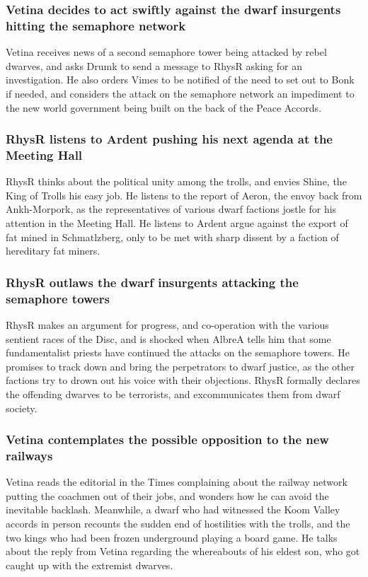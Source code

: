 \subsubsection{\Gls{Vetina} decides to act swiftly against the dwarf insurgents hitting the
    semaphore network}
\Gls{Vetina} receives news of a second semaphore tower being attacked by rebel dwarves, and asks
\Gls{Drumk} to send a message to \Gls{RhysR} asking for an investigation. He also orders \Gls{Vimes}
to be notified of the need to set out to Bonk if needed, and considers the attack on the semaphore
network an impediment to the new world government being built on the back of the Peace Accords.

\subsubsection{\Gls{RhysR} listens to \Gls{Ardent} pushing his next agenda at the Meeting Hall}
\Gls{RhysR} thinks about the political unity among the trolls, and envies \Gls{Shine}, the King of
Trolls his easy job. He listens to the report of \Gls{Aeron}, the envoy back from Ankh-Morpork, as
the representatives of various dwarf factions jostle for his attention in the Meeting Hall. He
listens to \Gls{Ardent} argue against the export of fat mined in Schmatlzberg, only to be met with
sharp dissent by a faction of hereditary fat miners.

\subsubsection{\Gls{RhysR} outlaws the dwarf insurgents attacking the semaphore towers}
\Gls{RhysR} makes an argument for progress, and co-operation with the various sentient races of the
Disc, and is shocked when \Gls{AlbreA} tells him that some fundamentalist priests have continued
the attacks on the semaphore towers. He promises to track down and bring the perpetrators to dwarf
justice, as the other factions try to drown out his voice with their objections. \Gls{RhysR}
formally declares the offending dwarves to be terrorists, and excommunicates them from dwarf
society.

\subsubsection{\Gls{Vetina} contemplates the possible opposition to the new railways}
\Gls{Vetina} reads the editorial in the Times complaining about the railway network putting the
coachmen out of their jobs, and wonders how he can avoid the inevitable backlash. Meanwhile, a
dwarf who had witnessed the Koom Valley accords in person recounts the sudden end of hostilities
with the trolls, and the two kings who had been frozen underground playing a board game. He talks
about the reply from \Gls{Vetina} regarding the whereabouts of his eldest son, who got caught up
with the extremist dwarves.

